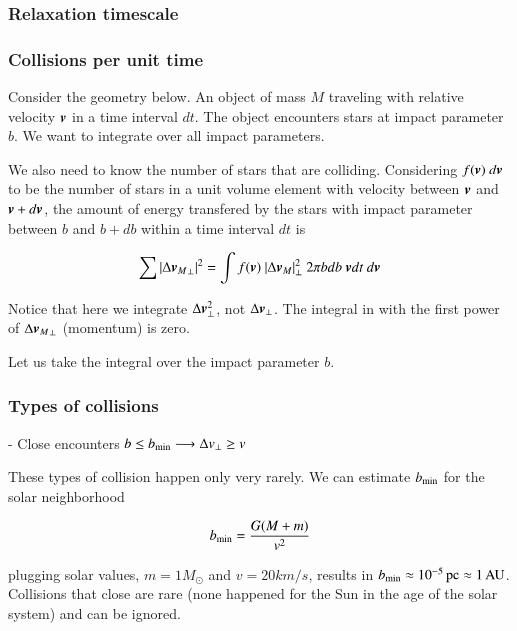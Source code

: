 \subsubsection{Relaxation timescale}

\subsubsection{Collisions per unit time}

Consider the geometry below. An object of mass $M$ traveling with relative velocity ${\boldsymbol{v}}$ in a time interval $dt$. The object encounters stars at impact parameter $b$. We want to integrate over all impact parameters.

We also need to know the number of stars that are colliding. Considering $f({\boldsymbol{v}}) \ d{\boldsymbol{v}}$ to be the number of stars in a unit volume element with velocity between ${\boldsymbol{v}}$ and ${\boldsymbol{v}}+d{\boldsymbol{v}}$, the amount of energy transfered by the stars with impact parameter between $b$ and $b+db$ within a time interval $dt$ is 

\begin{equation}
\sum |\Delta {\v{v}_M}_\perp|^2 = \int f(\v{v}) \  |\Delta \v{v}_{M}|_\perp^2 \ 2\pi b db \ \v{v} dt \ d\v{v}
\end{equation}

Notice that here we integrate $\Delta {\boldsymbol{v}}_\perp^2$, not $\Delta {\boldsymbol{v}}_\perp$. The integral in with the first power of $\Delta {{\boldsymbol{v}}_M}_\perp$ (momentum) is zero. 

Let us take the integral over the impact parameter $b$. 

\subsubsection{Types of collisions}

- Close encounters $b \leq b_{\rm min} \longrightarrow \Delta v_\perp \geq v$

These types of collision happen only very rarely. We can estimate $b_{\rm min}$ for the solar neighborhood


\begin{equation}
b_{\rm min} = \frac{G(M+m)}{v^2} 
\end{equation}

plugging solar values, $m = 1 M_\odot$ and $v = 20 km/s$, results in $b_{\rm min} \approx 10^{-5} \,\mathrm{pc} \approx 1\,\mathrm{AU}$. Collisions that close are rare (none happened for the Sun in the age of the solar system) and can be ignored. 

